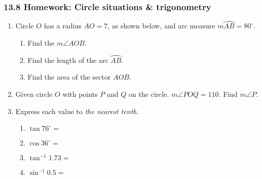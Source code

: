 \documentclass[12pt, twoside]{article}
\begin{document}
\subsubsection*{13.8 Homework: Circle situations \& trigonometry}
 \begin{enumerate}

  \item Circle $O$ has a radius $AO=7$, as shown below, and arc measure $m \wideparen{AB}=80^\circ$.
     \begin{center}
   \end{center}
   \begin{enumerate}
     \item Find the $m \angle AOB$. \vspace{1cm}
     \item Find the length of the arc $\wideparen{AB}$. \vspace{2.5cm}
     \item Find the area of the sector $AOB$. \vspace{2.5cm}
   \end{enumerate}

   \item Given circle $O$ with points $P$ and $Q$ on the circle. $m\angle POQ=110$. Find $m\angle P$.\\[1cm]

\newpage
\item Express each value to \emph{the nearest tenth}.  \vspace{0.5cm}
  \begin{multicols}{2}
    \begin{enumerate}
      \item $\tan 76^\circ = $ \vspace{0.5cm}
      \item $\cos 36^\circ =$
      \item $\tan^{-1} 1.73 = $ \vspace{0.5cm}
      \item $\sin^{-1} 0.5 =$
    \end{enumerate}
  \end{multicols}


\end{enumerate}
\end{document}
